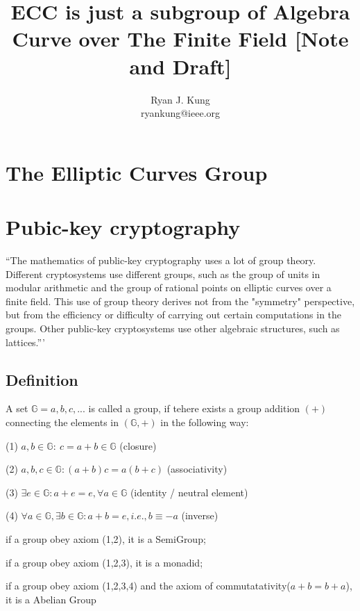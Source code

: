 \documentclass{article}
\author{Ryan J. Kung \\ryankung@ieee.org}
\title{ECC is just a subgroup of Algebra Curve over The Finite Field [Note and Draft]}
\begin{document}
\maketitle
\tableofcontents
\section{The Elliptic Curves Group}
\section{Pubic-key cryptography}
``The mathematics of public-key cryptography uses a lot of group theory. Different cryptosystems use different groups, such as the group of units in modular arithmetic and the group of rational points on elliptic curves over a finite field. This use of group theory derives not from the "symmetry" perspective, but from the efficiency or difficulty of carrying out certain computations in the groups. Other public-key cryptosystems use other algebraic structures, such as lattices.'''\cite{Kconrad}


\subsection{Definition\cite{Roland}}

A set $\mathbb{G}={a, b, c, ...}$ is called a group, if tehere exists a group addition $(+)$ connecting the elements in $(\mathbb{G}, +)$ in the following way:

(1) $a, b \in \mathbb{G}:\ c=a+b \in \mathbb{G}$ (closure)

(2) $a, b, c \in \mathbb{G}: (a+b)c=a(b+c)$ (associativity)

(3) $\exists e \in \mathbb{G}: a+e=e, \forall a \in \mathbb{G}$ (identity / neutral element)

(4) $\forall a \in \mathbb{G}, \exists b \in \mathbb{G}: a+b=e, i.e., b\equiv -a$ (inverse)

if a group obey axiom (1,2), it is a SemiGroup;

if a group obey axiom (1,2,3), it is a monadid;

if a group obey axiom (1,2,3,4) and the axiom of commutatativity($a+b=b+a$), it is a Abelian Group
\end{document}
